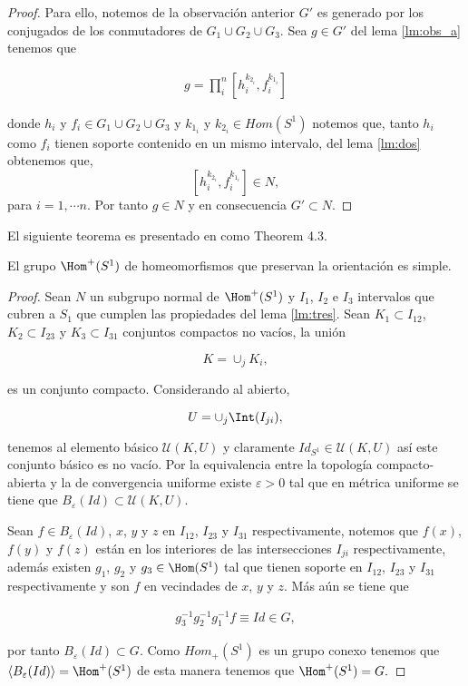 \begin{proof}
Para ello, notemos de la observación anterior $G'$ es generado por los conjugados de los conmutadores de $G_1\cup G_2 \cup G_3$. Sea $g \in G'$ del lema \ref{lm:obs_a} tenemos que 

\begin{align*}
g=\prod_i^n[h_i^{k_{2_i}},f_i^{k_{1_i}}]
\end{align*}

donde $h_i$ y $f_i \in G_1 \cup G_2 \cup G_3$ y $k_{1_i}$ y $k_{2_i} \in Hom(S^1)$ notemos que, tanto $h_i$ como $f_i$ tienen soporte contenido en un mismo intervalo, del lema \ref{lm:dos} obtenemos que, $$[h_i^{k_{2_i}},f_i^{k_{1_i}}] \in N,$$ para $i=1, \cdots n$.  Por tanto $g \in N$ y en consecuencia $G'  \subset N.$
\end{proof}

El siguiente teorema es presentado en \cite{ander} como Theorem 4.3.

\begin{te}
El grupo $\Hom^+(S^1)$ de homeomorfismos que preservan la orientación es simple.
\end{te}

\begin{proof}
Sean $N$ un subgrupo normal de  $\Hom^+(S^1)$ y  $I_1$, $I_2$ e $I_3$ intervalos que cubren a $S_1$ que cumplen las propiedades del lema \ref{lm:tres}. Sean  $K_1 \subset I_{12}$, $K_2 \subset I_{23} $ y $K_3 \subset I_{31}$ conjuntos compactos no vacíos, la unión

$$K= \cup_j K_i,$$

 es un conjunto compacto. Considerando al abierto,
 
 $$U=\cup_j \Int(I_{ji}),$$
 
 tenemos al elemento básico $\mathcal{U}(K,U)$ y claramente $Id_{S^1} \in  \mathcal{U}(K,U)$ así este conjunto básico es no vacío. Por la equivalencia entre la topología compacto-abierta y la de convergencia uniforme existe $\varepsilon >0 $ tal que en métrica uniforme se tiene que $B_\varepsilon(Id) \subset \mathcal{U}(K,U)$.

Sean $f \in B_\varepsilon(Id) $, $x$, $y$ y $z$ en $I_{12}$, $I_{23} $ y $I_{31}$ respectivamente, notemos que $f(x)$, $f(y)$ y $f(z)$ están en los interiores de las intersecciones $I_{ji}$ respectivamente, además existen $g_1$, $g_2$ y $g_3 \in \Hom(S^1)$ tal que tienen soporte en $I_{12}$, $I_{23} $ y $I_{31}$ respectivamente y son $f$ en vecindades de $x$, $y$ y $z.$ Más aún se tiene que 


\begin{align*}
g_3^{-1}g_2^{-1}g_1^{-1}f \equiv Id \in G,
\end{align*}



por tanto $B_\varepsilon(Id) \subset G$. Como $Hom_+(S ^{1})$ es un grupo conexo tenemos que $\langle B_\varepsilon(Id) \rangle= \Hom^+(S^1)$ de esta manera tenemos que $\Hom^+ (S^1)= G.$

 \end{proof} 

